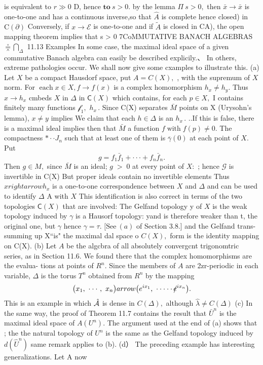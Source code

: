 is equivalent to $\scriptstyle r\gg0$ D, hence $\mathbf{to}\ s>0.$ by the lemma $\Pi~s>0,$ then ${\bar{x}}\to{\bar{x}}$ is one-to-one and has a continuous inverse,so that $\hat{A}$ is complete hence closed) in ${\mathrm{C}}(\partial)$ Conversely, if $x\to{\mathcal{E}}$ is one-to-one and if $\widetilde{A}$ is closed in CA), the open mapping theorem implies that s > 0 7CoMMUTATIVE BANACH ALGEBRAS $\stackrel{\circ}{\doublebarwedge}\bigcap_{\Delta}$ 11.13 Examples In some case, the maximal ideal space of a given commutative Banach algebra can easily be described explicily.、 In others, extreme pathologies occur. We shall now give some cxamples to illustrate this. (a) Let $X$ be a compact Hausdorf space, put $A=C(X),$ , with the supremum of $\textstyle X$ norm. For $\operatorname{each}x\in X,f\to f(x)$ is a complex homomorphism $h_{x}\neq h_{y}.$ Thus $x\to h_{x}$ cmbeds $\textstyle X$ in $\Delta$ in ${\mathsf{C}}(X)$ which contains, for each $p\in X,$ I contains finitely many functions ${\mathcal{f}}_{1},$ $h_{x}\,.$ Since C(X) separates $\bar{M}$ points on X (Urysohn's lemma), $x\neq y$ implies We claim that each $h\in\Delta$ is an $h_{x}\,.$ ..If this is false, there is a maximal ideal implies then that $\bar{M}$ a function $f\operatorname{with}f(p)\neq0.$ The compactness $\ast\cdot\cdot J_{n}$ such that at least one of them is ${\overline{{\gamma}}}(0)$ at each point of $X.$ Put $$ g=f_{1}\bar{f}_{1}+\cdot\cdot\cdot+f_{n}\bar{f}_{n}. $$ Then $g\in M,$ since $\bar{M}$ is an ideal; $\scriptstyle g\;>\;0$ at every point of $X{\mathrm{:}}$ ; hence $\scriptstyle{\mathcal{G}}$ is invertible in C(X) But proper ideals contain no invertible elements Thus $x rightarrow h_{x}$ is a one-to-one correspondence between $\textstyle X$ and $\Delta$ and can be used to identify $\Delta$ A with $\textstyle X$ This identification is also correct in terms of the two topologies ${\mathsf{C}}(X)$ that are involved: The Gelfand topology y of $\textstyle X$ is the weak topology induced by $\scriptstyle\gamma$ is a Hausorf topology: yand is therefore weaker than t, the original one, but $\scriptstyle\gamma$ hence $\gamma=\tau.$ $\mathrm{[See~}(a)$ of Section 3.8.] and the Gelfand trans- summing up X“is" the maximal dal space o $C(X),$ form is the identity mapping on C(X). (b) Let $\scriptstyle A$ be the algcbra of all absolutely convergcnt trigonomtric series, as in Section 11.6. We found there that the complex homomorphisms are the evalua- tions at points of $\textstyle R^{n}.$ Since the members of $\textstyle A$ are 2zr-periodic in each variable, $\Delta$ is the torus $T^{n}$ obtained from $\textstyle R^{n}$ by the mapping $$ \big(x_{1},\ \cdot\cdot\cdot\ ,\ x_{n}\big) arrow\big(e^{i x_{1}},\ \cdot\cdot\cdot\cdot\cdot\,\rlap/e^{i x_{n}}\big). $$ This is an example in which $\hat{\cal A}$ is dense in $C(\Delta),$ although ${\hat{\lambda}}\neq C(\Delta)$ (c) In the same way, the proof of Theorem 11.7 contains the result that ${\bar{U}}^{n}$ is the maximal ideal space of $A(U^{n}).$ The argument used at the end of (a) shows that ; the the natural topology of $U^{n}$ is the same as the Gelfand topology induced by ${\mathit{d}}({\widehat{U}}^{n})$ same remark applies to (b). (d） The preceding example has interesting generalizations. Let A now 